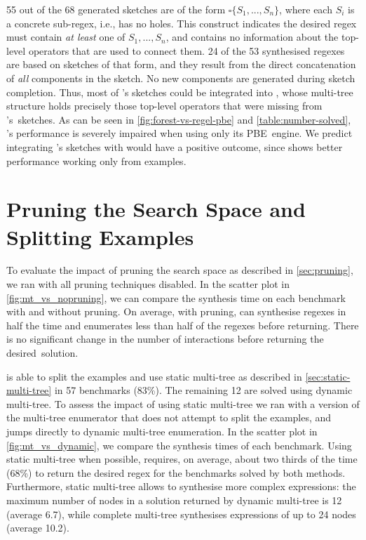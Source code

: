 55 out of the 68 generated sketches are of the form \(\square\{S_1, ..., S_n\}\),
where each \(S_i\) is a concrete sub-regex, i.e., has no holes.
This construct indicates the desired regex must contain \textit{at least} one of \(S_1, ..., S_n\),
and contains no information about the top-level operators that are used to connect them.
%
24 of the 53 synthesised regexes are based on sketches of that form, and they result from the direct concatenation of \textit{all} components in the sketch. No new components are generated during sketch completion.
%
Thus, most of \Regel{}'s sketches could be integrated into \Forest{}, whose multi-tree structure holds precisely those top-level operators that were missing from \Regel's~sketches. As can be seen in \autoref{fig:forest-vs-regel-pbe} and \autoref{table:number-solved}, \Regel's performance is severely impaired when using only its PBE~engine. We predict integrating \Regel{}'s sketches with \Forest would have a positive outcome, since \Forest shows better performance working only from examples.

\section{Pruning the Search Space and Splitting Examples}\label{sec:pruning-split}



To evaluate the impact of pruning the search space as described in \autoref{sec:pruning}, we ran \Forest{} with all pruning techniques disabled.
In the scatter plot in \autoref{fig:mt_vs_nopruning}, we can compare the synthesis time on each benchmark with and without pruning.
On average, with pruning, \Forest{} can synthesise regexes in half the time and enumerates less than half of the regexes before returning. There is no significant change in the number of interactions before returning the desired~solution.

\Forest{} is able to split the examples and use static multi-tree as described in \autoref{sec:static-multi-tree} in 57 benchmarks (83\%).
The remaining 12 are solved using dynamic multi-tree.
To assess the impact of using static multi-tree we ran \Forest{} with a version of the multi-tree enumerator that does not attempt to split the examples, and jumps directly to dynamic multi-tree enumeration.
In the scatter plot in \autoref{fig:mt_vs_dynamic}, we compare the synthesis times of each benchmark.
Using static multi-tree when possible, \Forest{} requires, on average, about two thirds of the time (68\%) to return the desired regex for the benchmarks solved by both methods.
Furthermore, static multi-tree allows \Forest{} to synthesise more complex expressions: the maximum number of nodes in a solution returned by dynamic multi-tree is 12 (average 6.7), while complete multi-tree synthesises expressions of up to 24 nodes (average 10.2).



